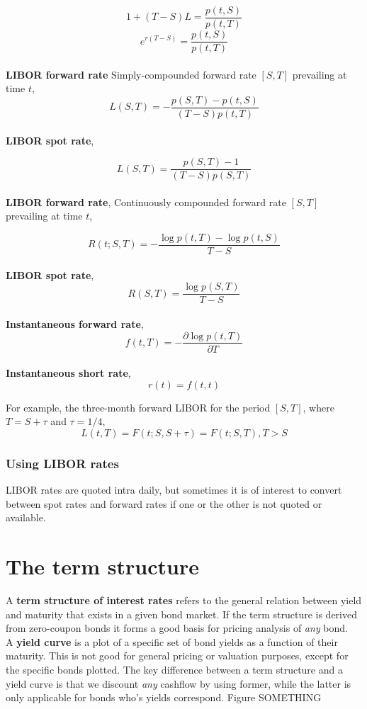 \documentclass[11pt,a4paper]{article}
\numberwithin{equation}{section}
\begin{document}
	\[
	1+(T-S)L=\frac{p(t,S)}{p(t,T)}
	\]
	\[
	e^{r(T-S)}=\frac{p(t,S)}{p(t,T)}
	\]
	\\
	\textbf{LIBOR forward rate}
	Simply-compounded forward rate $[S,T]$ prevailing at time $t$,
	\[
	L(S,T) = -\frac{p(S,T)-p(t,S)}{(T-S)p(t,T)}
	\]
	\\
	\textbf{LIBOR spot rate},

	\[
	L(S,T)=\frac{p(S,T)-1}{(T-S)p(S,T)}
	\]
	\\
	\textbf{LIBOR forward rate},
	Continuously compounded forward rate $[S,T]$ prevailing at time $t$,

	\[
	R(t;S,T)=-\frac{\log{p(t,T)}-\log{p(t,S)}}{T-S}
	\]
	\\
	\textbf{LIBOR spot rate},
	\[
	R(S,T)=\frac{\log{p(S,T)}}{T-S}
	\]
	\\
	\textbf{Instantaneous forward rate},
	\[
	f(t,T)=-\frac{\partial\log{p(t,T)}}{\partial{T}}
	\]
	\\
	\textbf{Instantaneous short rate},
	\[
	r(t)=f(t,t)
	\]

	For example, the three-month forward LIBOR for the period $[S,T]$, where $T=S+\tau$ and $\tau=1/4$,
	\[
	L(t,T) = F(t;S,S+\tau) = F(t;S,T), T>S
	\]

	\subsubsection{Using LIBOR rates}
	LIBOR rates are quoted intra daily, but sometimes it is of interest to convert between spot rates and forward rates if one or the
	other is not quoted or available.


	\section{The term structure}

	A \textbf{term structure of interest rates} refers to the general relation between yield and maturity that exists in a given bond market. If the term structure is derived from zero-coupon bonds it forms a good basis for pricing analysis of \emph{any} bond.\\

	A \textbf{yield curve} is a plot of a specific set of bond yields as a function of their maturity. This is not good for general pricing or valuation purposes, except for the specific bonds plotted. The key difference between a term structure and a yield curve is that we discount \emph{any} cashflow by using former, while the latter is only applicable for bonds who's yields correspond. Figure SOMETHING
\end{document}
